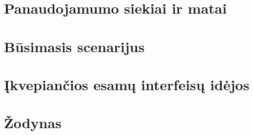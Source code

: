 \documentclass[oneside]{VUMIFPSkursinis}
\begin{document}
\section{Panaudojamumo siekiai ir matai}

\section{Būsimasis scenarijus}

\section{Įkvepiančios esamų interfeisų idėjos}

\section{Žodynas}
\end{document}
